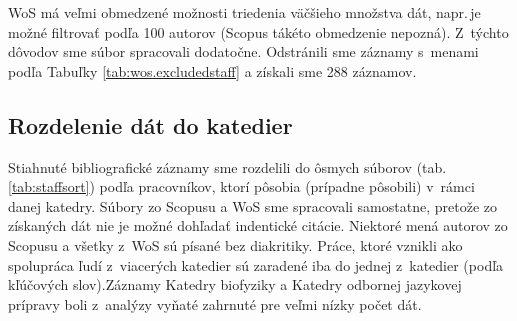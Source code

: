 WoS má veľmi obmedzené možnosti triedenia väčšieho množstva dát, napr.\,je možné
filtrovať podľa 100 autorov (Scopus tákéto obmedzenie nepozná).  Z~týchto
dôvodov sme súbor  spracovali dodatočne.
Odstránili sme záznamy s~menami podľa Tabuľky \ref{tab:wos.excludedstaff} a
získali sme 288 záznamov.


\subsection{Rozdelenie dát do katedier}

Stiahnuté bibliografické záznamy sme rozdelili do ôsmych súborov
(tab.\,\ref{tab:staffsort}) podľa pracovníkov, ktorí pôsobia (prípadne pôsobili)
v~rámci danej katedry.  Súbory zo Scopusu a WoS sme spracovali samostatne,
pretože zo získaných dát nie je možné dohľadať indentické citácie.  Niektoré
mená autorov zo Scopusu a všetky z~WoS sú písané bez diakritiky.  Práce, ktoré
vznikli ako spolupráca ľudí z~viacerých katedier sú zaradené iba do jednej
z~katedier (podľa kľúčových slov).Záznamy Katedry biofyziky a Katedry odbornej
jazykovej prípravy boli z~analýzy vyňaté zahrnuté pre veľmi nízky počet dát.

